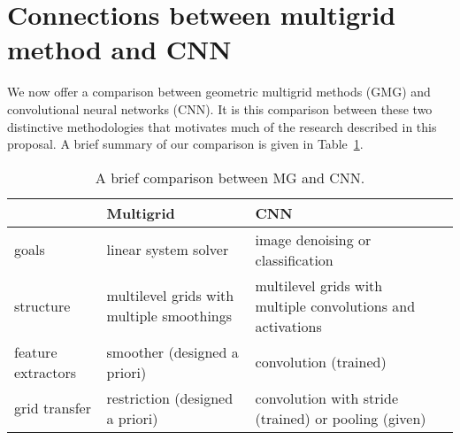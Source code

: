 
\section{Connections between multigrid method and CNN}
We now offer a comparison between geometric multigrid methods (GMG)
and convolutional neural networks (CNN).  It is this comparison
between these two distinctive methodologies that motivates much of the
research described in this proposal.  A brief summary of our comparison is
given in Table~\ref{MG-CNN}.
\medskip
\begin{table}[!htbp]
	\centering
	\footnotesize
	\begin{tabular}{|l|l|p{40mm}|c|}
		\hline
		&Multigrid &CNN  \\
		\hline
		goals  & linear system solver & image denoising or classification \\
		\hline
		structure	 &multilevel grids with multiple smoothings &multilevel grids with multiple convolutions and activations \\
		\hline
		feature extractors &smoother (designed a priori) & convolution (trained) \\
		\hline
		grid transfer & restriction (designed a priori) & convolution with stride  (trained) \newline or pooling (given)\\
		\hline
	\end{tabular}
	\caption{\footnotesize A brief comparison between MG and CNN.}
	\label{MG-CNN}
\end{table}

